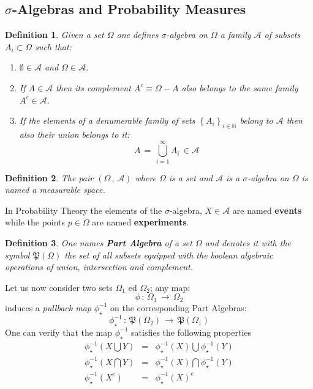 \documentclass[10pt,a4paper]{article}
\newtheorem{definizione}{Definition}[section]
\begin{document}
\subsection{$\sigma$-Algebras and  Probability Measures}
\begin{definizione}
\label{sigmalgeb} Given a set $\Omega$ one defines
$\sigma$-algebra on $\Omega$ a family $\mathcal{A}$ of
subsets $A_i \subset \Omega$ such that:
\begin{enumerate}
  \item $\emptyset \in \mathcal{A}$ and $\Omega \in \mathcal{A}$.
  \item If $A \in \mathcal{A}$ then its complement
  $A^c \equiv \Omega - A$ also belongs to the same family
  $A^c\in \mathcal{A}$.
  \item If the elements of a denumerable family  of sets
  $\left\{ A_i\right\}_{i\in \mathbb{N}}$ belong to
  $\mathcal{A}$ then also their union belongs to it:
  $$ A \, = \, \bigcup_{i=1}^{\infty} A_i \, \in  \mathcal{A}$$
\end{enumerate}
\end{definizione}
\begin{definizione}
\label{spazmisur} The pair $\left(\Omega\, , \, \mathcal{A}\right)$
where $\Omega$ is a set and $\mathcal{A}$ is a $\sigma$-algebra
on $\Omega$ is named a measurable space.
\end{definizione}
In Probability Theory the elements of the
$\sigma$-algebra, $X\in \mathcal{A}$ are named \textbf{events}
while the points  $p\in \Omega$ are named
\textbf{experiments}.
\begin{definizione}
\label{poweralg} One names \textbf{Part Algebra} of a set
 $\Omega$  and denotes it with the symbol $\mathfrak{P}(\Omega)$ the set of all subsets
 equipped with the boolean algebraic operations of  \textit{union,
intersection and   complement}.
\end{definizione}
Let us now consider two sets $\Omega_1$ ed $\Omega_2$; any map:
\begin{equation}\label{mappatrainsiemi}
    \phi \, : \,\Omega_1 \, \rightarrow \,\Omega_2
\end{equation}
induces a \textit{pullback map} $\phi_\star^{-1}$ on the
corresponding Part Algebras:
\begin{equation}\label{pullobacco}
    \phi_\star^{-1} \, : \,\mathfrak{P}(\Omega_2) \,\rightarrow \,\mathfrak{P}(\Omega_1)
\end{equation}
One can verify that the map $\phi_\star^{-1}$ satisfies the following properties
\begin{eqnarray}
\label{morfisema}
  \phi_\star^{-1}\left(X\bigcup Y \right) &=& \phi_\star^{-1}\left(X\right)\bigcup \phi_\star^{-1}\left(Y\right)\nonumber \\
  \phi_\star^{-1}\left(X\bigcap Y \right) &=& \phi_\star^{-1}\left(X\right)\bigcap \phi_\star^{-1}\left(Y\right)\nonumber \\
  \phi_\star^{-1}\left(X^c \right) &=& \phi_\star^{-1}\left(X \right)^c
\end{eqnarray}
\end{document}
